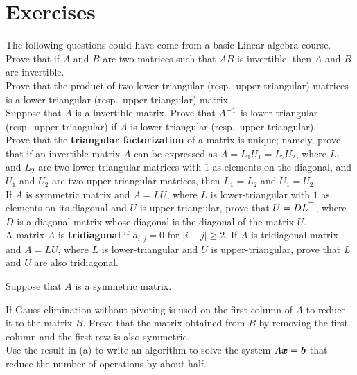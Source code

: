 \section{Exercises}

\begin{question}
The following questions could have come from a basic Linear algebra
course.\\
 Prove that if $A$ and $B$ are two \nn matrices such that $AB$ is
invertible, then $A$ and $B$ are invertible.\\
 Prove that the product of two lower-triangular (resp.\
upper-triangular) matrices is a lower-triangular
(resp.\ upper-triangular) matrix.\\
 Suppose that $A$ is a \nn invertible matrix.  Prove that
$\displaystyle A^{-1}$ is lower-triangular (resp.\ upper-triangular) if
$A$ is lower-triangular (resp.\ upper-triangular).\\
 Prove that the
{\bfseries triangular factorization}
of a \nn matrix is unique; namely, prove that if an invertible matrix
$A$ can be expressed as $A = L_1U_1 = L_2U_2$, where $L_1$ and $L_2$
are two lower-triangular matrices with $1$ as elements on the
diagonal, and $U_1$ and $U_2$ are two upper-triangular matrices, then
$L_1 = L_2$ and $U_1 = U_2$.\\
 If $A$ is \nn symmetric matrix and $A = LU$, where $L$ is
lower-triangular with $1$ as elements on its diagonal and $U$ is
upper-triangular, prove that $\displaystyle U = DL^\top$, where $D$ is
a diagonal matrix whose diagonal is the diagonal of the matrix $U$.\\
\subQ{f} A matrix $A$ is
{\bfseries tridiagonal}
if $a_{i,j} = 0$ for $|i-j|\geq 2$.  If $A$ is \nn tridiagonal matrix
and $A = LU$, where $L$ is lower-triangular and $U$ is
upper-triangular, prove that $L$ and $U$ are also tridiagonal.
\end{question}

\begin{question}
Suppose that $A$ is a \nn symmetric matrix.

 If Gauss elimination without pivoting is used on the first
column of $A$ to reduce it to the \nn matrix $B$.  Prove that the
\nm{(n-1)}{(n-1)} matrix obtained from $B$ by removing the first
column and the first row is also symmetric.\\
 Use the result in (a) to write an algorithm to solve the
system $A \bm{x} = \bm{b}$ that reduce the number of operations by
about half.
\end{question}


